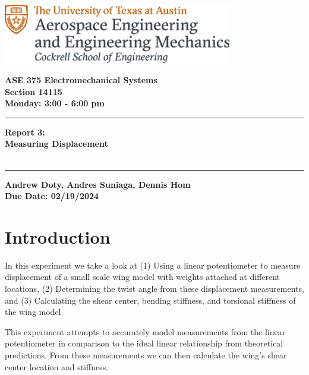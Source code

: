 \documentclass{article}
\begin{document}
\begin{titlepage}
  \centering
  \includegraphics[width=10cm]{ase-logo-formal.png}  %
  \vspace{1cm}  %
 
  \Large \textbf{ASE 375 Electromechanical Systems}\\
  \large \textbf{Section 14115}\\
  \vspace{0.5cm}
  \textbf{Monday: 3:00 - 6:00 pm}\\
 
  \vspace{1cm}
 
  \hrule
  \vspace{0.5cm}
 
  \Huge \textbf{Report 3:\\
  Measuring Displacement}\\
  \Huge \textbf{}\\
 
  \vspace{0.5cm}
  \hrule
 
  \vspace{1cm}
 
  \normalsize \textbf{Andrew Doty, Andres Suniaga, Dennis Hom}\\
  \normalsize \textbf{Due Date: 02/19/2024}
 
\end{titlepage}
\newpage

\tableofcontents
\thispagestyle{empty}
\newpage

\section{Introduction}
In this experiment we take a look at (1) Using a linear potentiometer to measure displacement of a small scale wing model with weights attached at different locations, (2) Determining the twist angle from these displacement measurements, and (3) Calculating the shear center, bending stiffness, and torsional stiffness of the wing model. 

This experiment attempts to accurately model measurements from the linear potentiometer in comparison to the ideal linear relationship from theoretical predictions. From these measurements we can then calculate the wing's shear center location and stiffness.  
\end{document}
